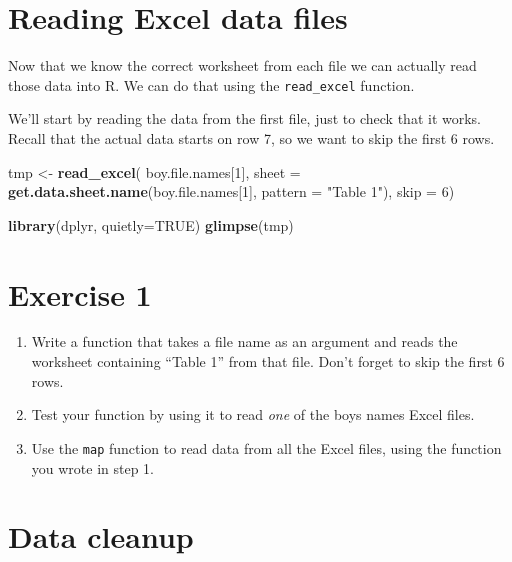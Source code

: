 \documentclass[]{book}
\newenvironment{Shaded}{\begin{snugshade}}{\end{snugshade}}
\newcommand{\KeywordTok}[1]{\textcolor[rgb]{0.13,0.29,0.53}{\textbf{#1}}}
\newcommand{\DataTypeTok}[1]{\textcolor[rgb]{0.13,0.29,0.53}{#1}}
\newcommand{\DecValTok}[1]{\textcolor[rgb]{0.00,0.00,0.81}{#1}}
\newcommand{\StringTok}[1]{\textcolor[rgb]{0.31,0.60,0.02}{#1}}
\newcommand{\OtherTok}[1]{\textcolor[rgb]{0.56,0.35,0.01}{#1}}
\newcommand{\NormalTok}[1]{#1}
\begin{document}
\section{Reading Excel data files}\label{reading-excel-data-files}

Now that we know the correct worksheet from each file we can actually
read those data into R. We can do that using the \texttt{read\_excel}
function.

We'll start by reading the data from the first file, just to check that
it works. Recall that the actual data starts on row 7, so we want to
skip the first 6 rows.

\begin{Shaded}
\begin{Highlighting}[]
\NormalTok{tmp <-}\StringTok{ }\KeywordTok{read_excel}\NormalTok{(}
\NormalTok{    boy.file.names[}\DecValTok{1}\NormalTok{],}
    \DataTypeTok{sheet =} \KeywordTok{get.data.sheet.name}\NormalTok{(boy.file.names[}\DecValTok{1}\NormalTok{],}
                                \DataTypeTok{pattern =} \StringTok{"Table 1"}\NormalTok{),}
    \DataTypeTok{skip =} \DecValTok{6}\NormalTok{)}

\KeywordTok{library}\NormalTok{(dplyr, }\DataTypeTok{quietly=}\OtherTok{TRUE}\NormalTok{)}
\KeywordTok{glimpse}\NormalTok{(tmp)}
\end{Highlighting}
\end{Shaded}

\section{Exercise 1}\label{exercise-1-3}

\begin{enumerate}
\def\labelenumi{\arabic{enumi}.}
\item
  Write a function that takes a file name as an argument and reads the
  worksheet containing ``Table 1'' from that file. Don't forget to skip
  the first 6 rows.
\item
  Test your function by using it to read \emph{one} of the boys names
  Excel files.
\item
  Use the \texttt{map} function to read data from all the Excel files,
  using the function you wrote in step 1.
\end{enumerate}

\section{Data cleanup}\label{data-cleanup}
\end{document}
